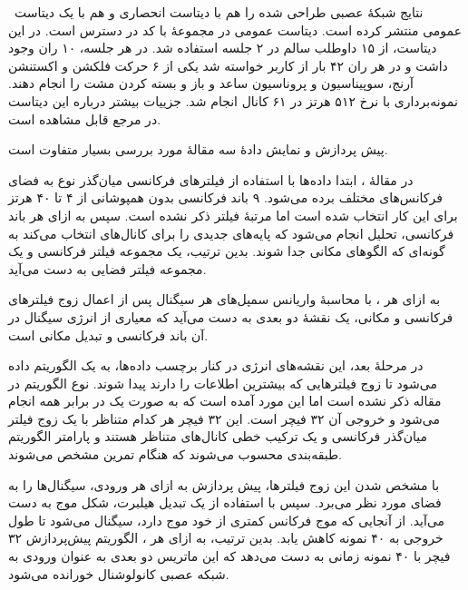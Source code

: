 \پ\ نتایج شبکهٔ عصبی طراحی شده را هم با دیتاست انحصاری و هم با یک دیتاست عمومی منتشر کرده است. دیتاست عمومی در مجموعهٔ  با کد  در دسترس است. در این دیتاست، از ۱۵ داوطلب سالم در ۲ جلسه استفاده شد. در هر جلسه، ۱۰ ران وجود داشت و در هر ران ۴۲ بار از کاربر خواسته شد یکی از ۶ حرکت فلکشن و اکستنشن آرنج، سوپیناسیون و پروناسیون ساعد و باز و بسته کردن مشت را انجام دهند. نمونه‌برداری با نرخ ۵۱۲ هرتز در ۶۱ کانال  انجام شد. جزییات بیشتر درباره این دیتاست در مرجع  قابل مشاهده است.

پیش پردازش و نمایش دادهٔ سه مقالهٔ مورد بررسی بسیار متفاوت است.

در مقالهٔ \آ، ابتدا داده‌ها با استفاده از فیلترهای فرکانسی میان‌گذر نوع  به فضای فرکانس‌های مختلف برده می‌شود. ۹ باند فرکانسی بدون همپوشانی از ۴ تا ۴۰ هرتز برای این کار انتخاب شده است اما مرتبهٔ فیلتر ذکر نشده است. سپس به ازای هر باند فرکانسی، تحلیل  انجام می‌شود که پایه‌های جدیدی را برای کانال‌های  انتخاب می‌کند به گونه‌ای که الگوهای مکانی جدا شوند. بدین ترتیب، یک مجموعه فیلتر فرکانسی و یک مجموعه فیلتر فضایی به دست می‌آید.

به ازای هر ، با محاسبهٔ واریانس سمپل‌های هر سیگنال پس از اعمال زوج فیلترهای فرکانسی و مکانی، یک نقشهٔ دو بعدی به دست می‌آید که معیاری از انرژی سیگنال در آن باند فرکانسی و تبدیل مکانی است.

در مرحلهٔ بعد، این نقشه‌های انرژی در کنار برچسب داده‌ها، به یک الگوریتم  داده می‌شود تا زوج فیلترهایی که بیشترین اطلاعات را دارند پیدا شوند. نوع الگوریتم  در مقاله ذکر نشده است اما این مورد آمده است که  به صورت یک در برابر همه انجام می‌شود و خروجی آن ۳۲ فیچر است. این ۳۲ فیچر هر کدام متناظر با یک زوج فیلتر میان‌گذر فرکانسی و یک ترکیب خطی کانال‌های  متناظر هستند و پارامتر الگوریتم طبقه‌بندی محسوب می‌شوند که هنگام تمرین مشخص می‌شوند.

با مشخص شدن این زوج فیلترها، پیش پردازش به ازای هر ورودی، سیگنال‌ها را به فضای مورد نظر می‌برد. سپس با استفاده از یک تبدیل هیلبرت، شکل  موج به دست می‌آید. از آنجایی که  موج فرکانس کمتری از خود موج دارد، سیگنال  می‌شود تا طول خروجی به ۴۰ نمونه کاهش یابد. بدین ترتیب، به ازای هر ، الگوریتم پیش‌پردازش ۳۲ فیچر با ۴۰ نمونه زمانی به دست می‌دهد که این ماتریس دو بعدی به عنوان ورودی به شبکه عصبی کانولوشنال خورانده می‌شود.

